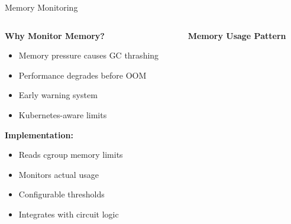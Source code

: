 \documentclass[aspectratio=169]{beamer}
\begin{document}
\begin{frame}{Memory Monitoring}
    \begin{columns}
        \begin{column}{0.5\textwidth}
            \textbf{Why Monitor Memory?}
            \begin{itemize}
                \item Memory pressure causes GC thrashing
                \item Performance degrades before OOM
                \item Early warning system
                \item Kubernetes-aware limits
            \end{itemize}
            
            \vspace{0.3cm}
            \textbf{Implementation:}
            \begin{itemize}
                \item Reads cgroup memory limits
                \item Monitors actual usage
                \item Configurable thresholds
                \item Integrates with circuit logic
            \end{itemize}
        \end{column}
        \begin{column}{0.5\textwidth}
            \begin{center}
                \textbf{Memory Usage Pattern}
            \end{center}
        \end{column}
    \end{columns}
\end{frame}
\end{document}
